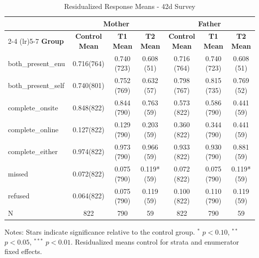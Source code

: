 
\begin{table}[htbp]
\centering
\begin{threeparttable}
\caption{Residualized Response Means - 42d Survey}
\begin{tabular}{lcccccc}
\toprule
& \multicolumn{3}{c}{Mother} & \multicolumn{3}{c}{Father} \\
\cmidrule(lr){2-4} \cmidrule(lr){5-7}
\textbf{Group} & \textbf{Control Mean} & \textbf{T1 Mean} & \textbf{T2 Mean} & \textbf{Control Mean} & \textbf{T1 Mean} & \textbf{T2 Mean} \\
\midrule
both_present_enu &  0.716(764) &  0.740 (723) &  0.608 (51) &  0.716 (764) &  0.740 (723) &  0.608 (51) \\
both_present_self &  0.740(801) &  0.752 (769) &  0.632 (57) &  0.798 (767) &  0.815 (735) &  0.769 (52) \\
complete_onsite &  0.848(822) &  0.844 (790) &  0.763 (59) &  0.573 (822) &  0.586 (790) &  0.441 (59) \\
complete_online &  0.127(822) &  0.129 (790) &  0.203 (59) &  0.360 (822) &  0.344 (790) &  0.441 (59) \\
complete_either &  0.974(822) &  0.973 (790) &  0.966 (59) &  0.933 (822) &  0.930 (790) &  0.881 (59) \\
missed &  0.072(822) &  0.075 (790) &  0.119* (59) &  0.072 (822) &  0.075 (790) &  0.119* (59) \\
refused &  0.064(822) &  0.075 (790) &  0.119 (59) &  0.100 (822) &  0.110 (790) &  0.119 (59) \\
N & 822 & 790 & 59 & 822 & 790 & 59 \\
\bottomrule
\end{tabular}
\begin{tablenotes}
\small
Notes: Stars indicate significance relative to the control group. 
$^{*}$ $p<0.10$, $^{**}$ $p<0.05$, $^{***}$ $p<0.01$.
Residualized means control for strata and enumerator fixed effects.
\end{tablenotes}
\end{threeparttable}
\end{table}
